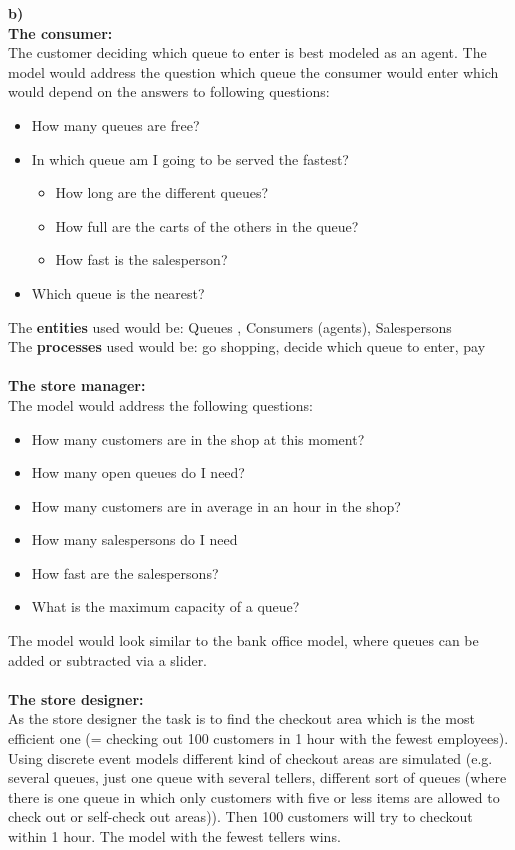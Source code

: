 \textbf{b)}\\
\textbf{The consumer:}\\
The customer deciding which queue to enter is best modeled as an agent. The model would address the question which queue the consumer would enter which would depend on the answers to following questions:
\begin{itemize}
  \item How many queues are free?
  \item In which queue am I going to be served the fastest?
  		\begin{itemize}
  		  \item How long are the different queues?
  		  \item How full are the carts of the others in the queue?
  		  \item How fast is the salesperson?		  
		\end{itemize}
  \item Which queue is the nearest?
\end{itemize}
The \textbf{entities} used would be: Queues , Consumers (agents), Salespersons\\
The \textbf{processes} used would be: go shopping, decide which queue to enter, pay\\\\
\textbf{The store manager:}\\
The model would address the following questions:
\begin{itemize}
  \item How many customers are in the shop at this moment?
    \item How many open queues do I need?
      \item How many customers are in average  in an hour in the shop?
        \item How many salespersons do I need 
        \item How fast are the salespersons?
        \item What is the maximum capacity of a queue?
\end{itemize}
The model would look similar to the bank office model, where queues can be added or subtracted via a slider.\\\\
\textbf{The store designer:}\\
As the store designer the task is to find the checkout area which is the most efficient one 
(= checking out 100 customers in 1 hour with the fewest employees). Using discrete event models different
kind of checkout areas are simulated (e.g. several queues, just one queue with several tellers, different
sort of queues (where there is one queue in which only customers with five or less items are allowed to check out 
or self-check out areas)). Then 100 customers will try to checkout within 1 hour. The model with the fewest tellers wins.

